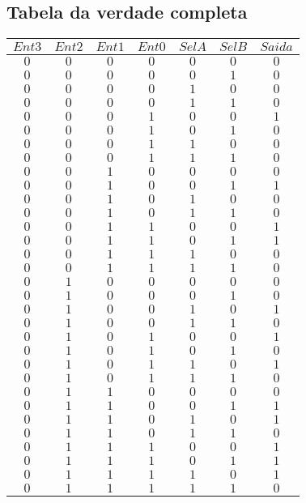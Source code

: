 \documentclass [15pt,a4paper,twoside]{article}
\begin{document}
\subsection{Tabela da verdade completa}
\begin{center}
\begin{tabular}{cccccc|c}
$Ent3$&$Ent2$&$Ent1$&$Ent0$&$SelA$&$SelB$&$Saida$\\
\hline
$0$&$0$&$0$&$0$&$0$&$0$&$0$\\
$0$&$0$&$0$&$0$&$0$&$1$&$0$\\
$0$&$0$&$0$&$0$&$1$&$0$&$0$\\
$0$&$0$&$0$&$0$&$1$&$1$&$0$\\
$0$&$0$&$0$&$1$&$0$&$0$&$1$\\
$0$&$0$&$0$&$1$&$0$&$1$&$0$\\
$0$&$0$&$0$&$1$&$1$&$0$&$0$\\
$0$&$0$&$0$&$1$&$1$&$1$&$0$\\
$0$&$0$&$1$&$0$&$0$&$0$&$0$\\
$0$&$0$&$1$&$0$&$0$&$1$&$1$\\
$0$&$0$&$1$&$0$&$1$&$0$&$0$\\
$0$&$0$&$1$&$0$&$1$&$1$&$0$\\
$0$&$0$&$1$&$1$&$0$&$0$&$1$\\
$0$&$0$&$1$&$1$&$0$&$1$&$1$\\
$0$&$0$&$1$&$1$&$1$&$0$&$0$\\
$0$&$0$&$1$&$1$&$1$&$1$&$0$\\
$0$&$1$&$0$&$0$&$0$&$0$&$0$\\
$0$&$1$&$0$&$0$&$0$&$1$&$0$\\
$0$&$1$&$0$&$0$&$1$&$0$&$1$\\
$0$&$1$&$0$&$0$&$1$&$1$&$0$\\
$0$&$1$&$0$&$1$&$0$&$0$&$1$\\
$0$&$1$&$0$&$1$&$0$&$1$&$0$\\
$0$&$1$&$0$&$1$&$1$&$0$&$1$\\
$0$&$1$&$0$&$1$&$1$&$1$&$0$\\
$0$&$1$&$1$&$0$&$0$&$0$&$0$\\
$0$&$1$&$1$&$0$&$0$&$1$&$1$\\
$0$&$1$&$1$&$0$&$1$&$0$&$1$\\
$0$&$1$&$1$&$0$&$1$&$1$&$0$\\
$0$&$1$&$1$&$1$&$0$&$0$&$1$\\
$0$&$1$&$1$&$1$&$0$&$1$&$1$\\
$0$&$1$&$1$&$1$&$1$&$0$&$1$\\
$0$&$1$&$1$&$1$&$1$&$1$&$0$\\

\end{tabular}
\end{center}
\end{document}
